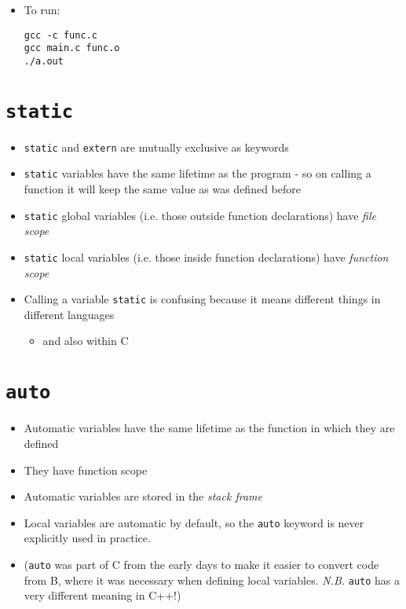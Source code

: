 \documentclass{article}
\begin{document}
\begin{itemize}
\item To run:
\begin{verbatim}
gcc -c func.c
gcc main.c func.o
./a.out
\end{verbatim}
\end{itemize}



\section{\texttt{static}}
\begin{itemize}
\item \verb!static! and \verb!extern! are mutually exclusive as keywords
\item \verb!static! variables have the same lifetime as the program - so on calling a function it will keep the same value as was defined before
\item \verb!static! global variables (i.e. those outside function declarations)
 have \emph{file scope}
\item \verb!static! local variables (i.e. those inside function declarations) have \emph{function scope}
\item Calling a variable \verb!static! is confusing because it means different things in different languages
\begin{itemize}
\item and also within C
\end{itemize}
\end{itemize}



\section{\texttt{auto}}
\begin{itemize}
\item Automatic variables have the same lifetime as the function in which they are defined
\item They have function scope
\item Automatic variables are stored in the \emph{stack frame}
\item Local variables are automatic by default, so the \verb!auto! keyword is never explicitly used in practice.
\item (\verb!auto! was part of C from the early days to make it easier to convert code from B, where it was necessary when defining local variables. \emph{N.B.} \verb!auto! has a very different meaning in C++!)
\end{itemize}
\end{document}
